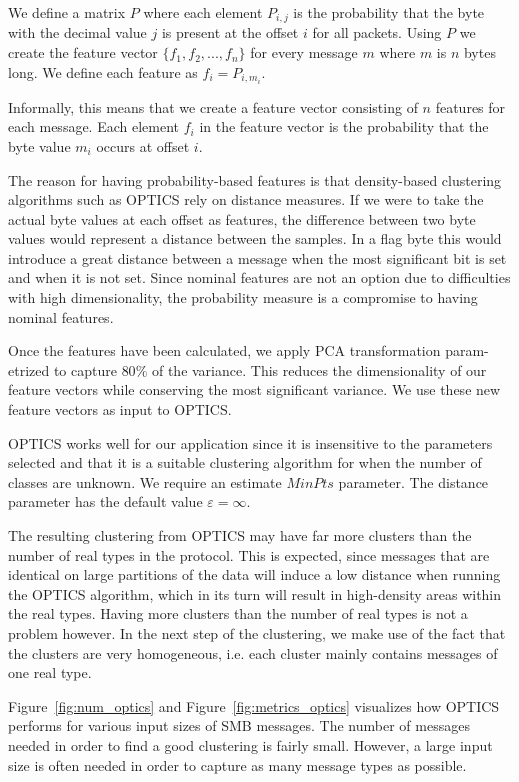 \documentclass[a4paper]{report}
\begin{document}
We define a matrix $P$ where each element $P_{i,j}$ is the probability that
the byte with the decimal value $j$ is present at the offset $i$ for all
packets. Using $P$ we create the feature vector $\{f_1, f_2, ..., f_n\}$ for
every message $m$ where $m$ is $n$ bytes long. We define each feature as
$f_i = P_{i, m_i}$.

Informally, this means that we create a feature vector consisting of $n$
features for each message. Each element $f_i$ in the feature vector is the
probability that the byte value $m_i$ occurs at offset $i$.

The reason for having probability-based features is that density-based
clustering algorithms such as OPTICS rely on distance measures. If we were to
take the actual byte values at each offset as features, the difference between
two byte values would represent a distance between the samples. In a flag byte
this would introduce a great distance between a message when the most
significant bit is set and when it is not set. Since nominal features are not
an option due to difficulties with high dimensionality, the probability
measure is a compromise to having nominal features.

Once the features have been calculated, we apply PCA transformation
param-etrized to capture $80\%$ of the variance. This reduces the
dimensionality of our feature vectors while conserving the most significant
variance. We use these new feature vectors as input to OPTICS.

OPTICS works well for our application since it is insensitive to the parameters
selected and that it is a suitable clustering algorithm for when the number of
classes are unknown. We require an estimate $MinPts$ parameter. The distance
parameter has the default value $\varepsilon = \infty$.

The resulting clustering from OPTICS may have far more clusters than the number
of real types in the protocol. This is expected, since messages that are
identical on large partitions of the data will induce a low distance when
running the OPTICS algorithm, which in its turn will result in high-density
areas within the real types. Having more clusters than the number of real
types is not a problem however. In the next step of the clustering, we make
use of the fact that the clusters are very homogeneous, i.e. each cluster mainly
contains messages of one real type.

Figure~\ref{fig:num_optics} and Figure~\ref{fig:metrics_optics} visualizes how
OPTICS performs for various input sizes of SMB messages. The number of messages
needed in order to find a good clustering is fairly small. However, a large
input size is often needed in order to capture as many message types as
possible.
\end{document}
